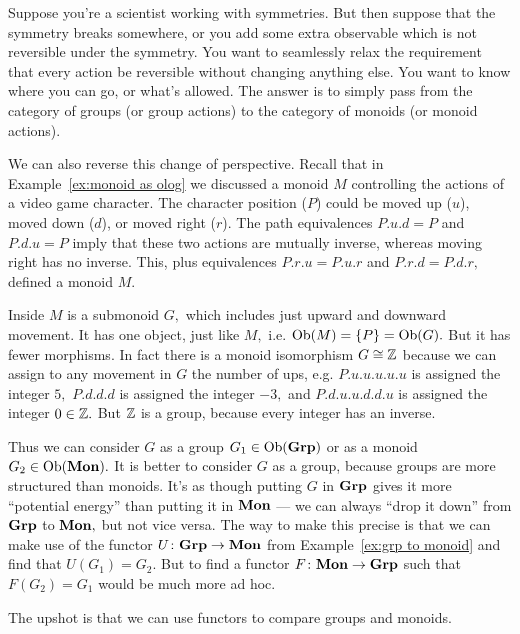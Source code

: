 \documentclass[../main/CT4S-EN-RU]{subfiles}
\begin{document}
\begin{sloganRUS}
\end{sloganRUS}

\begin{applicationENG}
Suppose you're a scientist working with symmetries. But then suppose that the symmetry breaks somewhere, or you add some extra observable which is not reversible under the symmetry. You want to seamlessly relax the requirement that every action be reversible without changing anything else. You want to know where you can go, or what's allowed. The answer is to simply pass from the category of groups (or group actions) to the category of monoids (or monoid actions). 

We can also reverse this change of perspective. Recall that in Example~\ref{ex:monoid as olog} we discussed a monoid $M$ controlling the actions of a video game character. The character position ($P$) could be moved up ($u$), moved down ($d$), or moved right ($r$). The path equivalences $P.u.d=P$ and $P.d.u=P$ imply that these two actions are mutually inverse, whereas moving right has no inverse. This, plus equivalences $P.r.u=P.u.r$ and $P.r.d=P.d.r,$ defined a monoid $M.$ 

Inside $M$ is a submonoid $G,$ which includes just upward and downward movement. It has one object, just like $M,$ i.e. $\operatorname{Ob}(M)=\{P\}=\operatorname{Ob}(G).$ But it has fewer morphisms. In fact there is a monoid isomorphism $G\cong{\mathbb Z}$ because we can assign to any movement in $G$ the number of ups, e.g. $P.u.u.u.u.u$ is assigned the integer $5,$ $P.d.d.d$ is assigned the integer $-3,$ and $P.d.u.u.d.d.u$ is assigned the integer $0\in{\mathbb Z}.$ But ${\mathbb Z}$ is a group, because every integer has an inverse.

Thus we can consider $G$ as a group $G_1\in\operatorname{Ob}({\mathbf{Grp}})$ or as a monoid $G_2\in\operatorname{Ob}({\mathbf{Mon}}).$ It is better to consider $G$ as a group, because groups are more structured than monoids. It's as though putting $G$ in ${\mathbf{Grp}}$ gives it more “potential energy” than putting it in ${\mathbf{Mon}}$ — we can always “drop it down” from ${\mathbf{Grp}}$ to ${\mathbf{Mon}},$ but not vice versa. The way to make this precise is that we can make use of the functor $U\colon{\mathbf{Grp}}\rightarrow{\mathbf{Mon}}$ from Example~\ref{ex:grp to monoid} and find that $U(G_1)=G_2.$ But to find a functor $F\colon{\mathbf{Mon}}\rightarrow{\mathbf{Grp}}$ such that $F(G_2)=G_1$ would be much more ad hoc. 

The upshot is that we can use functors to compare groups and monoids.
\end{applicationENG}

\begin{applicationRUS}
\end{applicationRUS}
\end{document}
